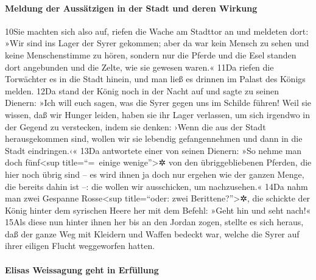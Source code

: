 \hypertarget{meldung-der-aussuxe4tzigen-in-der-stadt-und-deren-wirkung}{%
\paragraph{Meldung der Aussätzigen in der Stadt und deren
Wirkung}\label{meldung-der-aussuxe4tzigen-in-der-stadt-und-deren-wirkung}}

10Sie machten sich also auf, riefen die Wache am Stadttor an und
meldeten dort: »Wir sind ins Lager der Syrer gekommen; aber da war kein
Mensch zu sehen und keine Menschenstimme zu hören, sondern nur die
Pferde und die Esel standen dort angebunden und die Zelte, wie sie
gewesen waren.« 11Da riefen die Torwächter es in die Stadt hinein, und
man ließ es drinnen im Palast des Königs melden. 12Da stand der König
noch in der Nacht auf und sagte zu seinen Dienern: »Ich will euch sagen,
was die Syrer gegen uns im Schilde führen! Weil sie wissen, daß wir
Hunger leiden, haben sie ihr Lager verlassen, um sich irgendwo in der
Gegend zu verstecken, indem sie denken: ›Wenn die aus der Stadt
herausgekommen sind, wollen wir sie lebendig gefangennehmen und dann in
die Stadt eindringen.‹« 13Da antwortete einer von seinen Dienern: »So
nehme man doch fünf\textless sup title=``=~einige wenige''\textgreater✲
von den übriggebliebenen Pferden, die hier noch übrig sind -- es wird
ihnen ja doch nur ergehen wie der ganzen Menge, die bereits dahin ist
--: die wollen wir ausschicken, um nachzusehen.« 14Da nahm man zwei
Gespanne Rosse\textless sup title=``oder: zwei
Berittene?''\textgreater✲, die schickte der König hinter dem syrischen
Heere her mit dem Befehl: »Geht hin und seht nach!« 15Als diese nun
hinter ihnen her bis an den Jordan zogen, stellte es sich heraus, daß
der ganze Weg mit Kleidern und Waffen bedeckt war, welche die Syrer auf
ihrer eiligen Flucht weggeworfen hatten.

\hypertarget{elisas-weissagung-geht-in-erfuxfcllung}{%
\paragraph{Elisas Weissagung geht in
Erfüllung}\label{elisas-weissagung-geht-in-erfuxfcllung}}


